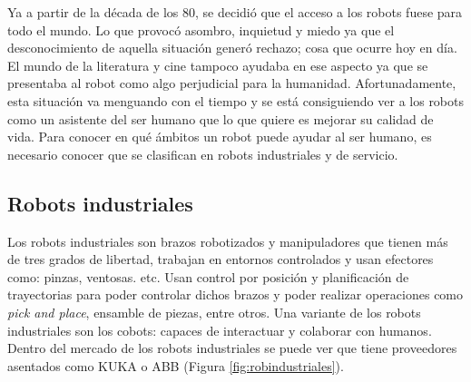 Ya a partir de la década de los 80, se decidió que el acceso a los robots fuese para todo el mundo. Lo que provocó asombro, inquietud y miedo ya que el desconocimiento de aquella situación generó rechazo; cosa que ocurre hoy en día. El mundo de la literatura y cine tampoco ayudaba en ese aspecto ya que se presentaba al robot como algo perjudicial para la humanidad. Afortunadamente, esta situación va menguando con el tiempo y se está consiguiendo ver a los robots como un asistente del ser humano que lo que quiere es mejorar su calidad de vida. Para conocer en qué ámbitos un robot puede ayudar al ser humano, es necesario conocer que se clasifican en robots industriales y de servicio. \\


\subsection{Robots industriales}

Los robots industriales son brazos robotizados y manipuladores que tienen más de tres grados de libertad, trabajan en entornos controlados y usan efectores como: pinzas, ventosas. etc. Usan control por posición y planificación de trayectorias para poder controlar dichos brazos y poder realizar operaciones como \textit{pick and place}, ensamble de piezas, entre otros. Una variante de los robots industriales son los cobots: capaces de interactuar y colaborar con humanos. Dentro del mercado de los robots industriales se puede ver que tiene proveedores asentados como \acs{KUKA} o \acs{ABB} (Figura \ref{fig:robindustriales}).





